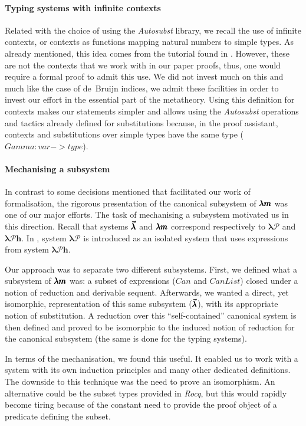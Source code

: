 \paragraph{Typing systems with infinite contexts}
Related with the choice of using the \textit{Autosubst} library, we recall the use of infinite contexts, or contexts as functions mapping natural numbers to simple types.
As already mentioned, this idea comes from the tutorial found in \cite{AutosubstManual}.
However, these are not the contexts that we work with in our paper proofs, thus, one would require a formal proof to admit this use.
We did not invest much on this and much like the case of de~Bruijn indices, we admit these facilities in order to invest our effort in the essential part of the metatheory.
Using this definition for contexts makes our statements simpler and allows using the \textit{Autosubst} operations and tactics already defined for substitutions because, in the proof assistant, contexts and substitutions over simple types have the same type (\lst$Gamma:var->type$).

\paragraph{Mechanising a subsystem}
In contrast to some decisions mentioned that facilitated our work of formalisation, the rigorous presentation of the canonical subsystem of $\pmb{\lambda m}$ was one of our major efforts.
The task of mechanising a subsystem motivated us in this direction.
Recall that systems $\pmb{\vec \lambda}$ and $\pmb{\lambda m}$ correspond respectively to $\pmb{\lambda \mathcal{P}}$ and $\pmb{\lambda \mathcal{P} h}$.
In \cite[Chapter~3]{JCES2002}, system $\pmb{\lambda \mathcal{P}}$ is introduced as an isolated system that uses expressions from system $\pmb{\lambda \mathcal{P} h}$.

Our approach was to separate two different subsystems.
First, we defined what a subsystem of $\pmb{\lambda m}$ was: a subset of expressions ($Can$ and $CanList$) closed under a notion of reduction and derivable sequent.
Afterwards, we wanted a direct, yet isomorphic, representation of this same subsystem ($\pmb{\vec \lambda}$), with its appropriate notion of substitution.
A reduction over this ``self-contained'' canonical system is then defined and proved to be isomorphic to the induced notion of reduction for the canonical subsystem (the same is done for the typing systems).

In terms of the mechanisation, we found this useful.
It enabled us to work with a system with its own induction principles and many other dedicated definitions.
The downside to this technique was the need to prove an isomorphism.
An alternative could be the subset types provided in \textit{Rocq}, but this would rapidly become tiring because of the constant need to provide the proof object of a predicate defining the subset.

